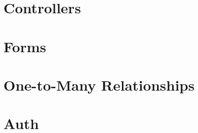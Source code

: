 \documentclass[b5paper,openany]{book}
\begin{document}
\chapter{Controllers}


\chapter{Forms}


\chapter{One-to-Many Relationships}


\chapter{Auth}








\end{document}
